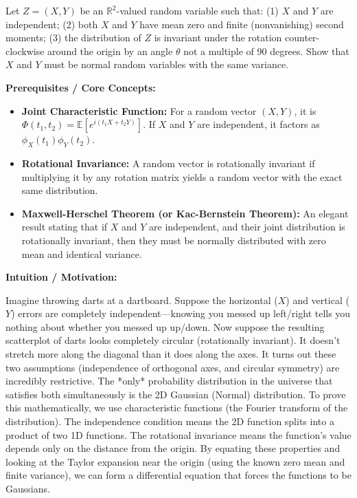 \begin{exercise}\label{probability:2020:4}
Let $Z = (X,Y)$ be an $\mathbb{R}^2$-valued random variable such that: (1) $X$ and $Y$ are independent; (2) both $X$ and $Y$ have mean zero and finite (nonvanishing) second moments; (3) the distribution of $Z$ is invariant under the rotation counter-clockwise around the origin by an angle $\theta$ not a multiple of 90 degrees. Show that $X$ and $Y$ must be normal random variables with the same variance.
\end{exercise}

\begin{solution}
\textbf{Prerequisites / Core Concepts:}
\begin{itemize}
    \item \textbf{Joint Characteristic Function:} For a random vector $(X, Y)$, it is $\Phi(t_1, t_2) = \mathbb{E}[e^{i(t_1 X + t_2 Y)}]$. If $X$ and $Y$ are independent, it factors as $\phi_X(t_1) \phi_Y(t_2)$.
    \item \textbf{Rotational Invariance:} A random vector is rotationally invariant if multiplying it by any rotation matrix yields a random vector with the exact same distribution.
    \item \textbf{Maxwell-Herschel Theorem (or Kac-Bernstein Theorem):} An elegant result stating that if $X$ and $Y$ are independent, and their joint distribution is rotationally invariant, then they must be normally distributed with zero mean and identical variance.
\end{itemize}

\textbf{Intuition / Motivation:}

Imagine throwing darts at a dartboard. Suppose the horizontal ($X$) and vertical ($Y$) errors are completely independent—knowing you messed up left/right tells you nothing about whether you messed up up/down. 
Now suppose the resulting scatterplot of darts looks completely circular (rotationally invariant). It doesn't stretch more along the diagonal than it does along the axes.
It turns out these two assumptions (independence of orthogonal axes, and circular symmetry) are incredibly restrictive. The *only* probability distribution in the universe that satisfies both simultaneously is the 2D Gaussian (Normal) distribution. 
To prove this mathematically, we use characteristic functions (the Fourier transform of the distribution). The independence condition means the 2D function splits into a product of two 1D functions. The rotational invariance means the function's value depends only on the distance from the origin. By equating these properties and looking at the Taylor expansion near the origin (using the known zero mean and finite variance), we can form a differential equation that forces the functions to be Gaussians.


\end{solution}
